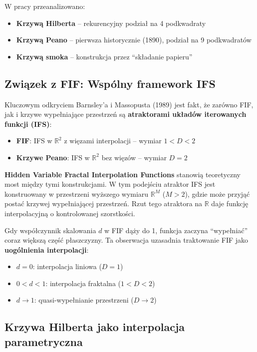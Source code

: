 \documentclass[11pt,a4paper]{article}
\begin{document}
W pracy przeanalizowano:
\begin{itemize}
    \item \textbf{Krzywą Hilberta} -- rekurencyjny podział na 4 podkwadraty
    \item \textbf{Krzywą Peano} -- pierwsza historycznie (1890), podział na 9 podkwadratów
    \item \textbf{Krzywą smoka} -- konstrukcja przez ``składanie papieru''
\end{itemize}

\subsection{Związek z FIF: Wspólny framework IFS}

Kluczowym odkryciem Barnsley'a i Massopusta (1989) jest fakt, że zarówno FIF, jak i krzywe wypełniające przestrzeń są \textbf{atraktorami układów iterowanych funkcji (IFS)}:
\begin{itemize}
    \item \textbf{FIF}: IFS w $\mathbb{R}^2$ z więzami interpolacji -- wymiar $1 < D < 2$
    \item \textbf{Krzywe Peano}: IFS w $\mathbb{R}^2$ bez więzów -- wymiar $D = 2$
\end{itemize}

\textbf{Hidden Variable Fractal Interpolation Functions} stanowią teoretyczny most między tymi konstrukcjami. W tym podejściu atraktor IFS jest konstruowany w przestrzeni wyższego wymiaru $\mathbb{R}^M$ ($M > 2$), gdzie może przyjąć postać krzywej wypełniającej przestrzeń. Rzut tego atraktora na $\mathbb{R}$ daje funkcję interpolacyjną o kontrolowanej szorstkości.

Gdy współczynnik skalowania $d$ w FIF dąży do 1, funkcja zaczyna ``wypełniać'' coraz większą część płaszczyzny. Ta obserwacja uzasadnia traktowanie FIF jako \textbf{uogólnienia interpolacji}:
\begin{itemize}
    \item $d = 0$: interpolacja liniowa ($D = 1$)
    \item $0 < d < 1$: interpolacja fraktalna ($1 < D < 2$)
    \item $d \to 1$: quasi-wypełnianie przestrzeni ($D \to 2$)
\end{itemize}

\subsection{Krzywa Hilberta jako interpolacja parametryczna}
\end{document}
